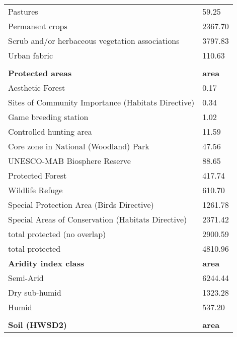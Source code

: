 \begin{longtable}{ll}
Pastures                                           & 59.25            \\
Permanent crops                                    & 2367.70          \\
Scrub and/or herbaceous vegetation associations    & 3797.83          \\
Urban fabric                                       & 110.63           \\
                                                   &                  \\
\textbf{Protected areas}                           & \textbf{area}    \\
Aesthetic Forest                                   & 0.17             \\
Sites of Community Importance (Habitats Directive) & 0.34             \\
Game breeding station                              & 1.02             \\
Controlled hunting area                            & 11.59            \\
Core zone in National (Woodland) Park              & 47.56            \\
UNESCO-MAB Biosphere Reserve                       & 88.65            \\
Protected Forest                                   & 417.74           \\
Wildlife Refuge                                    & 610.70           \\
Special Protection Area (Birds Directive)          & 1261.78          \\
Special Areas of Conservation (Habitats Directive) & 2371.42          \\
total protected (no overlap)                       & 2900.59          \\
total protected                                    & 4810.96          \\
\textbf{Aridity index class}                       & \textbf{area}    \\
Semi-Arid                                          & 6244.44          \\
Dry sub-humid                                      & 1323.28          \\
Humid                                              & 537.20           \\
                                                   &                  \\
\textbf{Soil (HWSD2)}                              & \textbf{area}    \\

\end{longtable}
